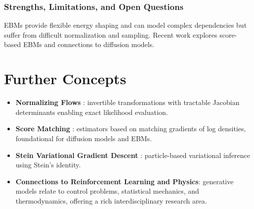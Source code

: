 \documentclass[11pt]{book}
\begin{document}
\subsection{Strengths, Limitations, and Open Questions}
EBMs provide flexible energy shaping and can model complex dependencies but suffer from difficult normalization and sampling. Recent work explores score-based EBMs and connections to diffusion models.

\chapter{Further Concepts}
\begin{itemize}
    \item \textbf{Normalizing Flows} \cite{rezende2015}: invertible transformations with tractable Jacobian determinants enabling exact likelihood evaluation.
    \item \textbf{Score Matching} \cite{hyvarinen2005}: estimators based on matching gradients of log densities, foundational for diffusion models and EBMs.
    \item \textbf{Stein Variational Gradient Descent} \cite{liu2016}: particle-based variational inference using Stein's identity.
    \item \textbf{Connections to Reinforcement Learning and Physics}: generative models relate to control problems, statistical mechanics, and thermodynamics, offering a rich interdisciplinary research area.
\end{itemize}
\end{document}
